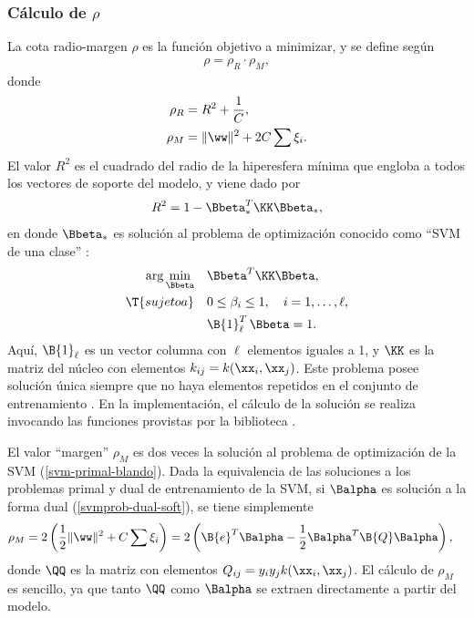 %
\subsubsection{Cálculo de $\rho$}
%
La cota radio-margen $\rho$ es la función objetivo a minimizar, y
se define según
%
\begin{align}
  \rho = \rho_R \cdot \rho_M,
\end{align}
%
donde
%
\begin{align}
  \label{rho-r}
  \rho_R &= R^2+\frac{1}{C}, \\
  \label{rho-m}
  \rho_M &= \|\ww\|^2+2C\sum\xi_i.
\end{align}
%
El valor $R^2$ es el cuadrado del radio de la hiperesfera mínima que
engloba a todos los vectores de soporte del modelo, y viene dado por
%
\begin{align}
  R^2 = 1 - \Bbeta_*^T \KK \Bbeta_*,
\end{align}
%
en donde $\Bbeta_*$ es solución al problema de optimización conocido
como ``SVM de una clase'' \cite{scholkopf}:
%
\begin{align}
\begin{split}
  \arg\min_{\Bbeta}\quad&\Bbeta^T \KK \Bbeta,\\
  \T{sujeto a}    \quad&0\leq\beta_i\leq{}1,\quad{}i=1,\ldots,\ell,\\
                       &\B{1}^T_\ell\,\Bbeta=1.
  \end{split}
  \label{svm-oneclass}
\end{align}
%
Aquí, $\B{1}_{\ell}$ es un vector columna con $\ell$ elementos iguales
a 1, y $\KK$ es la matriz del núcleo con elementos
$k_{ij}=k(\xx_i,\xx_j)$.
Este problema posee solución única siempre que no haya elementos
repetidos en el conjunto de entrenamiento \cite{chung}.
En la implementación, el cálculo de la solución se realiza invocando
las funciones provistas por la biblioteca  \cite{libsvm}.

El valor ``margen'' $\rho_M$ es dos veces la solución al problema de
optimización de la SVM (\autoref{svm-primal-blando}).
Dada la equivalencia de las soluciones a los problemas primal y dual
de entrenamiento de la SVM, si $\Balpha$ es solución a la forma dual
(\autoref{svmprob-dual-soft}), se tiene simplemente
%
\begin{align}
\label{prieqdual}
  \rho_M &= 2\left(\frac{1}{2}\|\ww\|^2+C\sum\xi_i \right)
  =2\left(\B{e}^T\Balpha-\frac{1}{2}\Balpha^T\B{Q}\Balpha\right),
\end{align}
%
donde $\QQ$ es la matriz con elementos $Q_{ij}=y_iy_jk(\xx_i,\xx_j)$.
El cálculo de $\rho_M$ es sencillo, ya que tanto $\QQ$ como $\Balpha$
se extraen directamente a partir del modelo.
